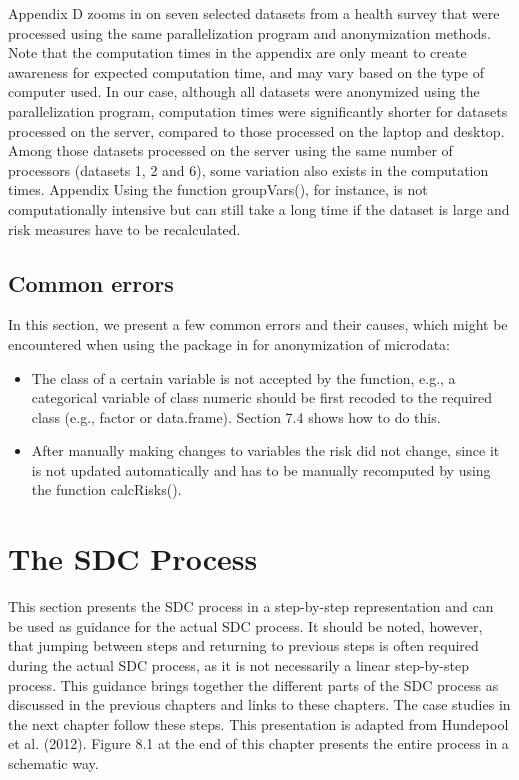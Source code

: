 \documentclass[letterpaper,10pt,english]{sphinxmanual}
\begin{document}
Appendix D zooms in on seven selected datasets from a health survey that
were processed using the same parallelization program and anonymization
methods. Note that the computation times in the appendix are only meant
to create awareness for expected computation time, and may vary based on
the type of computer used. In our case, although all datasets were
anonymized using the parallelization program, computation times were
significantly shorter for datasets processed on the server, compared to
those processed on the laptop and desktop. Among those datasets
processed on the server using the same number of processors (datasets 1,
2 and 6), some variation also exists in the computation times.  Appendix 
Using the function groupVars(), for instance, is not computationally
intensive but can still take a long time if the dataset is large and
risk measures have to be recalculated.


\section{Common errors}
\label{\detokenize{sdcMicro:common-errors}}
In this section, we present a few common errors and their causes, which
might be encountered when using the  package in  for
anonymization of microdata:
\begin{itemize}
\item {} 
The class of a certain variable is not accepted by the function,
e.g., a categorical variable of class numeric should be first recoded
to the required class (e.g., factor or data.frame). Section 7.4 shows
how to do this.

\item {} 
After manually making changes to variables the risk did not change,
since it is not updated automatically and has to be manually
recomputed by using the function calcRisks().

\end{itemize}


\chapter{The SDC Process}
\label{\detokenize{process::doc}}\label{\detokenize{process:the-sdc-process}}
This section presents the SDC process in a step-by-step representation
and can be used as guidance for the actual SDC process. It should be
noted, however, that jumping between steps and returning to previous
steps is often required during the actual SDC process, as it is not
necessarily a linear step-by-step process. This guidance brings together
the different parts of the SDC process as discussed in the previous
chapters and links to these chapters. The case studies in the next
chapter follow these steps. This presentation is adapted from Hundepool
et al. (2012). Figure 8.1 at the end of this chapter presents the entire
process in a schematic way.
\end{document}
